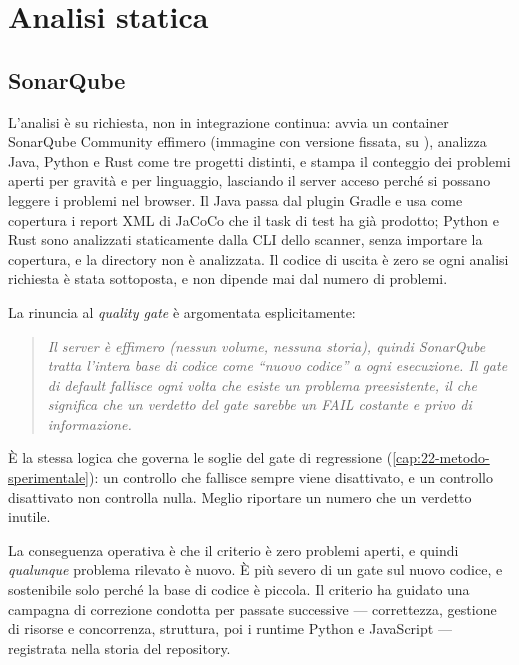 \section{Analisi statica}

\subsection{SonarQube}

L'analisi \`e su richiesta, non in integrazione continua:
 avvia un container SonarQube Community effimero (immagine
con versione fissata, su ), analizza Java, Python e Rust
come tre progetti distinti, e stampa il conteggio dei problemi aperti per
gravit\`a e per linguaggio, lasciando il server acceso perch\'e si possano
leggere i problemi nel browser. Il Java passa dal plugin Gradle
 e usa come copertura i report XML di JaCoCo che il task di
test ha gi\`a prodotto; Python e Rust sono analizzati staticamente dalla CLI
dello scanner, senza importare la copertura, e la directory 
non \`e analizzata. Il codice di uscita \`e zero se ogni analisi richiesta \`e
stata sottoposta, e non dipende mai dal numero di problemi.

La rinuncia al \emph{quality gate} \`e argomentata esplicitamente:

\begin{quote}\itshape
Il server \`e effimero (nessun volume, nessuna storia), quindi SonarQube tratta
l'intera base di codice come ``nuovo codice'' a ogni esecuzione. Il gate di
default fallisce ogni volta che esiste un problema preesistente, il che
significa che un verdetto del gate sarebbe un FAIL costante e privo di
informazione.
\end{quote}

\`E la stessa logica che governa le soglie del gate di regressione
(\cref{cap:22-metodo-sperimentale}): un controllo che fallisce sempre viene
disattivato, e un controllo disattivato non controlla nulla. Meglio riportare un
numero che un verdetto inutile.

La conseguenza operativa \`e che il criterio \`e zero problemi aperti, e
quindi \emph{qualunque} problema rilevato \`e nuovo. \`E pi\`u severo di un gate
sul nuovo codice, e sostenibile solo perch\'e la base di codice \`e piccola. Il
criterio ha guidato una campagna di correzione condotta per passate successive
--- correttezza, gestione di risorse e concorrenza, struttura, poi i runtime
Python e JavaScript --- registrata nella storia del repository.

